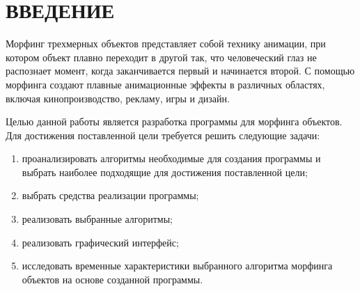 \chapter*{ВВЕДЕНИЕ}

Морфинг трехмерных объектов представляет собой технику анимации, при котором объект плавно переходит в другой так, что человеческий глаз не распознает момент, когда заканчивается первый и начинается второй. С помощью морфинга создают плавные анимационные эффекты в различных областях, включая кинопроизводство, рекламу, игры и дизайн. 

Целью данной работы является разработка программы для морфинга объектов. Для достижения поставленной цели требуется решить следующие задачи:

\begin{enumerate}[label={\arabic*)}]
\item проанализировать алгоритмы необходимые для создания программы и выбрать наиболее подходящие для достижения поставленной цели;
\item выбрать средства реализации программы;
\item реализовать выбранные алгоритмы;
\item реализовать графический интерфейс;
\item исследовать временные характеристики выбранного алгоритма морфинга объектов на основе созданной программы.
\end{enumerate}
